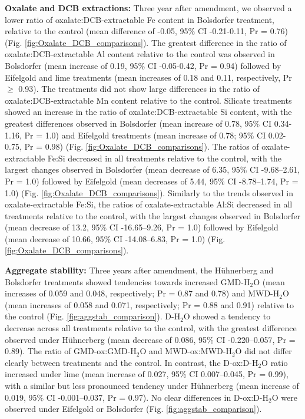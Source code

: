 \documentclass[preprint,12pt]{elsarticle}
\begin{document}
\textbf{Oxalate and DCB extractions:}
    Three year after amendment, we observed a lower ratio of oxalate:DCB-extractable Fe content in Bolsdorfer treatment, relative to the control (mean difference of -0.05,  95\% CI -0.21-0.11, Pr = 0.76) (Fig. \ref{fig:Oxalate_DCB_comparisons}). The greatest difference in the ratio of oxalate:DCB-extractable Al content relative to the control was observed in Bolsdorfer (mean increase of 0.19, 95\% CI -0.05-0.42, Pr = 0.94) followed by Eifelgold and lime treatments (mean increases of 0.18 and 0.11, respectively, Pr $\geq$ 0.93). The treatments did not show large differences in the ratio of oxalate:DCB-extractable Mn content relative to the control. Silicate treatments showed an increase in the ratio of oxalate:DCB-extractable Si content, with the greatest differences observed in Bolsdorfer (mean increase of 0.78, 95\% CI 0.34-1.16, Pr = 1.0) and Eifelgold treatments (mean increase of 0.78; 95\% CI 0.02-0.75, Pr = 0.98) (Fig. \ref{fig:Oxalate_DCB_comparisons}). 
  The ratios of oxalate-extractable Fe:Si decreased in all treatments relative to the control, with the largest changes observed in Bolsdorfer (mean decrease of 6.35, 95\% CI  -9.68--2.61, Pr = 1.0) followed by Eifelgold (mean decreases of 5.44, 95\% CI -8.78--1.74, Pr = 1.0) (Fig. \ref{fig:Oxalate_DCB_comparisons}). 
  Similarly to the trends observed in oxalate-extractable Fe:Si, the ratios of oxalate-extractable Al:Si decreased in all treatments relative to the control, with the largest changes observed in Bolsdorfer (mean decrease of 13.2, 95\% CI -16.65--9.26, Pr = 1.0) followed by Eifelgold (mean decrease of 10.66, 95\% CI -14.08--6.83, Pr = 1.0) (Fig. \ref{fig:Oxalate_DCB_comparisons}).

\textbf{Aggregate stability:}
  Three years after amendment, the Hühnerberg and Bolsdorfer treatments showed tendencies towards increased GMD-H$_2$O (mean increases of 0.059 and 0.048, respectively; Pr = 0.87 and 0.78) and MWD-H$_2$O (mean increases of 0.058 and 0.071, respectively; Pr = 0.88 and 0.91) relative to the control (Fig. \ref{fig:aggstab_comparison}). D-H$_2$O showed a tendency to decrease across all treatments relative to the control, with the greatest difference observed under Hühnerberg (mean decrease of 0.086, 95\% CI -0.220–0.057, Pr = 0.89).
  The ratio of GMD-ox:GMD-H$_2$O and MWD-ox:MWD-H$_2$O did not differ clearly between treatments and the control. In contrast, the D-ox:D-H$_2$O ratio increased under lime (mean increase of 0.027, 95\% CI 0.007–0.045, Pr = 0.99), with a similar but less pronounced tendency under Hühnerberg (mean increase of 0.019, 95\% CI -0.001–0.037, Pr = 0.97). No clear differences in D-ox:D-H$_2$O were observed under Eifelgold or Bolsdorfer (Fig. \ref{fig:aggstab_comparison}).
\end{document}
